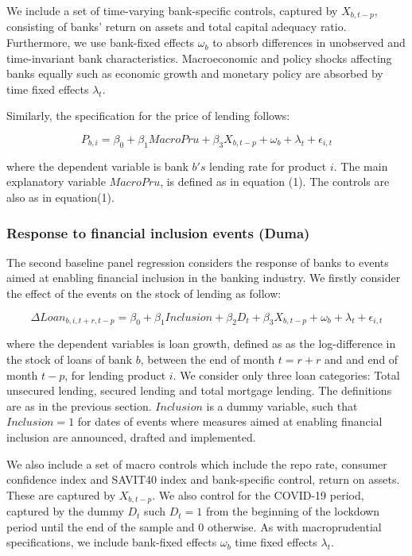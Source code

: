 \documentclass[
  letterpaper,
  DIV=11,
  numbers=noendperiod]{scrartcl}
\begin{document}
We include a set of time-varying bank-specific controls, captured by
\(X_{b,t-p}\), consisting of banks' return on assets and total capital
adequacy ratio. Furthermore, we use bank-fixed effects \(\omega_{b}\) to
absorb differences in unobserved and time-invariant bank
characteristics. Macroeconomic and policy shocks affecting banks equally
such as economic growth and monetary policy are absorbed by time fixed
effects \(\lambda_{t}\).

Similarly, the specification for the price of lending follows:

\begin{equation}
    P_{b,i}= \beta_{0}+\beta_{1}MacroPru +\beta_{3}X_{b,t-p}+ \omega_{b}+ \lambda_{t}+\epsilon_{i,t}
\end{equation}

where the dependent variable is bank \(b's\) lending rate for product
\(i\). The main explanatory variable \(MacroPru\), is defined as in
equation (1). The controls are also as in equation(1).

\hypertarget{response-to-financial-inclusion-events-duma}{%
\subsubsection{Response to financial inclusion events
(Duma)}\label{response-to-financial-inclusion-events-duma}}

The second baseline panel regression considers the response of banks to
events aimed at enabling financial inclusion in the banking industry. We
firstly consider the effect of the events on the stock of lending as
follow:

\begin{equation}
     \Delta Loan_{b,i,t+r,t-p}= \beta_{0}+\beta_{1}Inclusion+ \beta_{2}D_{t}+\beta_{3}X_{b,t-p}+ \omega_{b}+ \lambda_{t}+\epsilon_{i,t}
\end{equation}

where the dependent variables is loan growth, defined as as the
log-difference in the stock of loans of bank \(b\), between the end of
month \(t=r+r\) and and end of month \(t-p\), for lending product \(i\).
We consider only three loan categories: Total unsecured lending, secured
lending and total mortgage lending. The definitions are as in the
previous section. \(Inclusion\) is a dummy variable, such that
\(Inclusion=1\) for dates of events where measures aimed at enabling
financial inclusion are announced, drafted and implemented.

We also include a set of macro controls which include the repo rate,
consumer confidence index and SAVIT40 index and bank-specific control,
return on assets. These are captured by \(X_{b,t-p}\). We also control
for the COVID-19 period, captured by the dummy \(D_{t}\) such
\(D_{t}=1\) from the beginning of the lockdown period until the end of
the sample and \(0\) otherwise. As with macroprudential specifications,
we include bank-fixed effects \(\omega_{b}\) time fixed effects
\(\lambda_{t}\).
\end{document}
